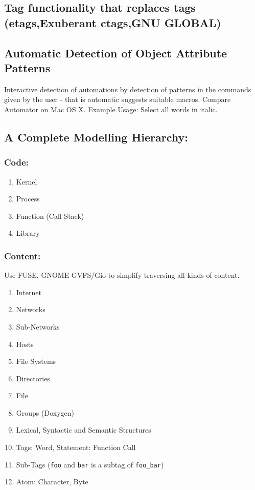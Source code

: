 \documentclass[a4paper,10pt,twocolumn]{article}
\begin{document}
\subsection{Tag functionality that replaces tags (etags,Exuberant ctags,GNU GLOBAL)}


\subsection{Automatic Detection of Object Attribute Patterns}

Interactive detection of automations by detection of patterns in the commands given by the user - that is automatic suggests suitable macros. Compare Automator on Mac OS X.
Example Usage: Select all words in italic.

\subsection{A Complete Modelling Hierarchy:}


\subsubsection{Code:}

\begin{enumerate}
\item Kernel
\item Process
\item Function (Call Stack)
\item Library
\end{enumerate}

\subsubsection{Content:}

Use FUSE, GNOME GVFS/Gio to simplify traversing all kinds of content.
\begin{enumerate}
\item Internet
\item Networks
\item Sub-Networks
\item Hosts
\item File Systems
\item Directories
\item File
\item Groups (Doxygen)
\item Lexical, Syntactic and Semantic Structures
\item Tags: Word, Statement: Function Call
\item Sub-Tags (\texttt{foo} and \texttt{bar} is a subtag of \texttt{foo_bar})
\item Atom: Character, Byte
\end{enumerate}
\end{document}
